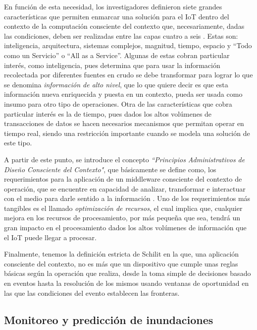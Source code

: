 En función de esta necesidad, los investigadores definieron siete grandes características que permiten enmarcar una solución para el IoT dentro del contexto de la computación consciente del contexto que, necesariamente, dadas las condiciones, deben ser realizadas entre las capas cuatro a seis \citep{sundmaeker2010vision}. Estas son: inteligencia, arquitectura, sistemas complejos, magnitud, tiempo, espacio y ``Todo como un Servicio'' o ``All as a Service''. Algunas de estas cobran particular interés, como inteligencia, pues determina que para usar la información recolectada por diferentes fuentes en crudo se debe transformar para lograr lo que se denomina \textit{información de alto nivel}, que lo que quiere decir es que esta información nueva enriquecida y puesta en un contexto, pueda ser usada como insumo para otro tipo de operaciones. Otra de las características que cobra particular interés es la de tiempo, pues dados los altos volúmenes de transacciones de datos se hacen necesarios mecanismos que permitan operar en tiempo real, siendo una restricción importante cuando se modela una solución de este tipo. 
%
%

A partir de este punto, se introduce el concepto \textit{``Principios Administrativos de Diseño Consciente del Contexto"}, que básicamente se define como, los requerimientos para la aplicación de un middleware consciente del contexto de operación, que se encuentre en capacidad de analizar, transformar e interactuar con el medio para darle sentido a la información \citep{martin2010automatic,ramparany2007open,bernardos2008data}. Uno de los requerimientos más tangibles es el llamado \textit{optimización de recursos}, el cual implica que, cualquier mejora en los recursos de procesamiento, por más pequeña que sea, tendrá un gran impacto en el procesamiento dados los altos volúmenes de información que el IoT puede llegar a procesar.

Finalmente, tenemos la definición estricta de Schilit \citep{schilit1994context} en la que, una aplicación consciente del contexto, no es más que un dispositivo que cumple unas reglas básicas según la operación que realiza, desde la toma simple de decisiones basado en eventos hasta la resolución de los mismos usando ventanas de oportunidad en las que las condiciones del evento establecen las fronteras. 

\subsection{Monitoreo y predicción de inundaciones}

